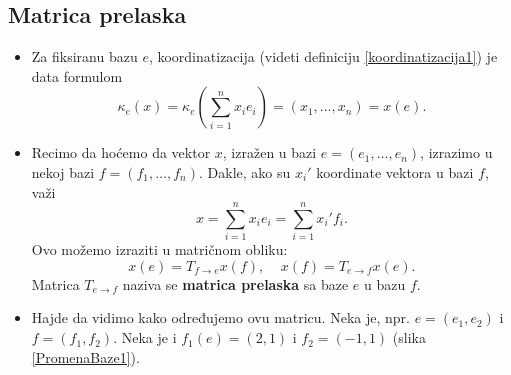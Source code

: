 \documentclass[a4paper,12pt,twoside]{report}
\numberwithin{algorithm}{section}
\begin{document}
\subsection{Matrica prelaska}
\label{MatricaPrelaska}
\begin{itemize}
    \item Za fiksiranu bazu $e$, koordinatizacija (videti definiciju \ref{koordinatizacija1}) je data formulom
    \[ \kappa_e(x) = \kappa_e\left(\sum_{i=1}^{n} x_ie_i \right) = (x_1, \dots, x_n) = x(e). \]
    \item Recimo da hoćemo da vektor $x$, izražen u bazi $e = (e_1, \dots, e_n)$, izrazimo u nekoj bazi $f = (f_1, \dots, f_n)$. Dakle, ako su $x_i'$ 
    koordinate vektora u bazi $f$, važi
    \[ x = \sum_{i=1}^{n} x_ie_i = \sum_{i=1}^{n} x_i'f_i. \] 
    Ovo možemo izraziti u matričnom obliku:
    \[ x(e) = T_{f \to e}x(f), \;\;\;\; x(f) = T_{e \to f}x(e). \]
    Matrica $T_{e \to f}$ naziva se \textbf{matrica prelaska} sa baze $e$ u bazu $f$.
    \item Hajde da vidimo kako određujemo ovu matricu. Neka je, npr. $e=(e_1, e_2)$ i $f = (f_1, f_2)$. Neka je i $f_1(e) = (2, 1)$ i $f_2 = (-1, 1)$ (slika \ref{PromenaBaze1}).
    \begin{figure}[!h]
        \centering
\end{figure}
\end{itemize}
\end{document}
